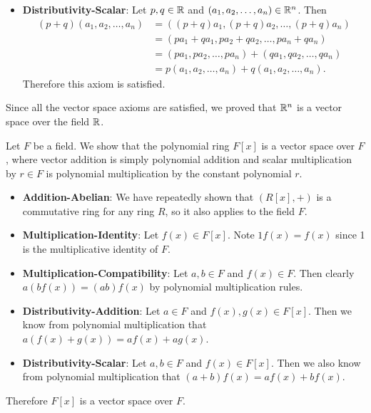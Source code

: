 \begin{example}
\begin{itemize}
        \item \textbf{Distributivity-Scalar}: Let $p, q \in \mathbb{R}$ and $(a_1, a_2, \dots, a_n) \in \mathbb{R}^n$. Then
        \begin{align*}
            (p+q)(a_1, a_2, \dots, a_n) &= ((p+q)a_1, (p+q)a_2, \dots, (p+q)a_n)\\
            &= (pa_1 + qa_1, pa_2 + qa_2, \dots, pa_n + qa_n)\\
            &= (pa_1, pa_2, \dots, pa_n) + (qa_1, qa_2, \dots, qa_n)\\
            &= p(a_1, a_2, \dots, a_n) + q(a_1, a_2, \dots, a_n).
        \end{align*}
        Therefore this axiom is satisfied.
    \end{itemize}
    
    Since all the vector space axioms are satisfied, we proved that $\mathbb{R}^n$ is a vector space over the field $\mathbb{R}$.
\end{example}

\begin{example}\label{example-polynomial-ring-over-field-is-vector-space}
    Let $F$ be a field. We show that the polynomial ring $F[x]$ is a vector space over $F$, where vector addition is simply polynomial addition and scalar multiplication by $r \in F$ is polynomial multiplication by the constant polynomial $r$.
    \begin{itemize}
        \item \textbf{Addition-Abelian}: We have repeatedly shown that $(R[x], +)$ is a commutative ring for any ring $R$, so it also applies to the field $F$.
        
        \item \textbf{Multiplication-Identity}: Let $f(x) \in F[x]$. Note $1f(x) = f(x)$ since 1 is the multiplicative identity of $F$.

        \item \textbf{Multiplication-Compatibility}: Let $a, b \in F$ and $f(x) \in F$. Then clearly $a(bf(x)) = (ab)f(x)$ by polynomial multiplication rules.
        
        \item \textbf{Distributivity-Addition}: Let $a \in F$ and $f(x), g(x) \in F[x]$. Then we know from polynomial multiplication that $a(f(x) + g(x)) = af(x) + ag(x)$.
        
        \item \textbf{Distributivity-Scalar}: Let $a, b \in F$ and $f(x) \in F[x]$. Then we also know from polynomial multiplication that $(a+b)f(x) = af(x) + bf(x)$.
    \end{itemize}
    Therefore $F[x]$ is a vector space over $F$.
\end{example}

